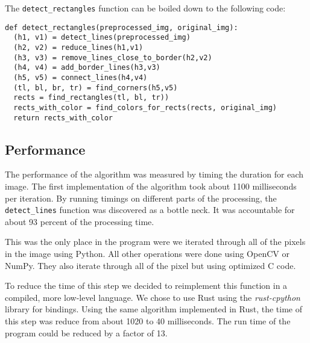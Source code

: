The \texttt{detect\_rectangles} function can be boiled down to the following
code:
\begin{lstlisting}
def detect_rectangles(preprocessed_img, original_img):
  (h1, v1) = detect_lines(preprocessed_img)
  (h2, v2) = reduce_lines(h1,v1)
  (h3, v3) = remove_lines_close_to_border(h2,v2)
  (h4, v4) = add_border_lines(h3,v3)
  (h5, v5) = connect_lines(h4,v4)
  (tl, bl, br, tr) = find_corners(h5,v5)
  rects = find_rectangles(tl, bl, tr))
  rects_with_color = find_colors_for_rects(rects, original_img)
  return rects_with_color
\end{lstlisting}

\subsection{Performance}

The performance of the algorithm was measured by timing the duration for each
image. The first implementation of the algorithm took about 1100 milliseconds per
iteration. By running timings on different parts of the processing, the
\texttt{detect\_lines} function was discovered as a bottle neck. It was
accountable for about 93 percent of the processing time.

This was the only place in the program were we iterated through all of the pixels
in the image using Python. All other operations were done using OpenCV or NumPy.
They also iterate through all of the pixel but using optimized C code.

To reduce the time of this step we decided to reimplement this function in a
compiled, more low-level language. We chose to use Rust using the \textit{rust-cpython}
library for bindings. Using the same algorithm implemented in Rust, the time of
this step was reduce from about 1020 to 40 milliseconds. The run time of the
program could be reduced by a factor of 13.

%
%
